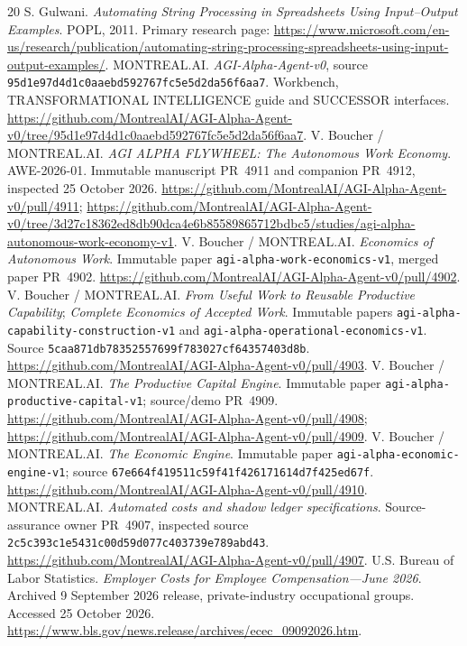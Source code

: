\documentclass[11pt,letterpaper]{article}
\newcommand{\code}[1]{\texttt{\small #1}}
\begin{document}
\clearpage
\begin{thebibliography}{20}
\small
{} S. Gulwani. \emph{Automating String Processing in Spreadsheets Using Input--Output Examples}. POPL, 2011. Primary research page: \url{https://www.microsoft.com/en-us/research/publication/automating-string-processing-spreadsheets-using-input-output-examples/}.
 MONTREAL.AI. \emph{AGI-Alpha-Agent-v0}, source \code{95d1e97d4d1c0aaebd592767fc5e5d2da56f6aa7}. Workbench, TRANSFORMATIONAL INTELLIGENCE guide and SUCCESSOR interfaces. \url{https://github.com/MontrealAI/AGI-Alpha-Agent-v0/tree/95d1e97d4d1c0aaebd592767fc5e5d2da56f6aa7}.
 V. Boucher / MONTREAL.AI. \emph{AGI ALPHA FLYWHEEL: The Autonomous Work Economy}. AWE-2026-01. Immutable manuscript PR~4911 and companion PR~4912, inspected 25 October 2026. \url{https://github.com/MontrealAI/AGI-Alpha-Agent-v0/pull/4911}; \url{https://github.com/MontrealAI/AGI-Alpha-Agent-v0/tree/3d27c18362ed8db90dca4e6b85589865712bdbc5/studies/agi-alpha-autonomous-work-economy-v1}.
 V. Boucher / MONTREAL.AI. \emph{Economics of Autonomous Work}. Immutable paper \code{agi-alpha-work-economics-v1}, merged paper PR~4902. \url{https://github.com/MontrealAI/AGI-Alpha-Agent-v0/pull/4902}.
 V. Boucher / MONTREAL.AI. \emph{From Useful Work to Reusable Productive Capability}; \emph{Complete Economics of Accepted Work}. Immutable papers \code{agi-alpha-capability-construction-v1} and \code{agi-alpha-operational-economics-v1}. Source \code{5caa871db78352557699f783027cf64357403d8b}. \url{https://github.com/MontrealAI/AGI-Alpha-Agent-v0/pull/4903}.
 V. Boucher / MONTREAL.AI. \emph{The Productive Capital Engine}. Immutable paper \code{agi-alpha-productive-capital-v1}; source/demo PR~4909. \url{https://github.com/MontrealAI/AGI-Alpha-Agent-v0/pull/4908}; \url{https://github.com/MontrealAI/AGI-Alpha-Agent-v0/pull/4909}.
 V. Boucher / MONTREAL.AI. \emph{The Economic Engine}. Immutable paper \code{agi-alpha-economic-engine-v1}; source \code{67e664f419511c59f41f426171614d7f425ed67f}. \url{https://github.com/MontrealAI/AGI-Alpha-Agent-v0/pull/4910}.
 MONTREAL.AI. \emph{Automated costs and shadow ledger specifications}. Source-assurance owner PR~4907, inspected source \code{2c5c393c1e5431c00d59d077c403739e789abd43}. \url{https://github.com/MontrealAI/AGI-Alpha-Agent-v0/pull/4907}.
 U.S. Bureau of Labor Statistics. \emph{Employer Costs for Employee Compensation---June 2026}. Archived 9 September 2026 release, private-industry occupational groups. Accessed 25 October 2026. \url{https://www.bls.gov/news.release/archives/ecec_09092026.htm}.

\end{thebibliography}
\end{document}
